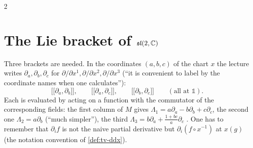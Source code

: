 \begin{paracol}{2}
\section{The Lie bracket of $\mathfrak{sl}(2,\mathbb{C})$}\label{sec:sa-bracket}

Three brackets are needed. In the coordinates $(a,b,c)$ of the chart $x$ the lecture writes $\partial_a,\partial_b,\partial_c$ for $\partial/\partial x^1,\partial/\partial x^2,\partial/\partial x^3$ (``it is convenient to label by the coordinate names when one calculates''):    
\[
  \bigl[\!\bigl[\partial_a,\partial_b\bigr]\!\bigr],\qquad
  \bigl[\!\bigl[\partial_a,\partial_c\bigr]\!\bigr],\qquad
  \bigl[\!\bigl[\partial_b,\partial_c\bigr]\!\bigr]\qquad(\text{all at }\mathbb 1).
\]
Each is evaluated by acting on a function with the commutator of the corresponding fields: the first column of $M$ gives $\Lambda_1=a\partial_a-b\partial_b+c\partial_c$, the second one $\Lambda_2=a\partial_b$ (``much simpler''), the third $\Lambda_3=b\partial_a+\frac{1+bc}{a}\partial_c$       . One has to remember that $\partial_i f$ is not the naive partial derivative but $\partial_i(f\circ x^{-1})$ at $x(g)$ (the notation convention of \cref{def:tv-ddx}).


\end{paracol}
